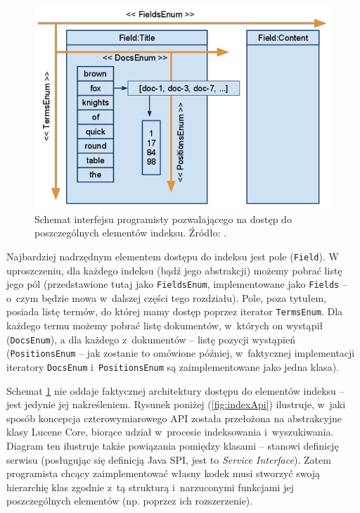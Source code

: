 \begin{figure}[here]
 \includegraphics[scale=0.5]{pictures/api.png}
 \caption{Schemat interfejsu programisty pozwalającego na dostęp do poszczególnych elementów indeksu. Źródło: \cite{flexindex}.\label{fig:4dimAPI}}
\end{figure}

Najbardziej nadrzędnym elementem dostępu do indeksu jest pole (\texttt{Field}). W uproszczeniu, dla każdego indeksu (bądź jego abstrakcji) możemy pobrać listę jego pól (przedstawione tutaj jako \texttt{FieldsEnum}, implementowane jako \texttt{Fields} -- o~czym będzie mowa w~dalszej części tego rozdziału). Pole, poza tytułem, posiada listę termów, do której mamy dostęp poprzez iterator \texttt{TermsEnum}. Dla każdego termu możemy pobrać listę dokumentów, w~których on wystąpił (\texttt{DocsEnum}), a dla każdego z~dokumentów -- listę pozycji wystąpień (\texttt{PositionsEnum} -- jak zostanie to omówione później, w~faktycznej implementacji iteratory \texttt{DocsEnum} i~\texttt{PositionsEnum} są zaimplementowane jako jedna klasa).

Schemat \ref{fig:4dimAPI} nie oddaje faktycznej architektury dostępu do elementów indeksu -- jest jedynie jej nakreśleniem. Rysunek poniżej (\ref{fig:indexApi}) ilustruje, w~jaki sposób koncepcja czterowymiarowego API została przełożona na abstrakcyjne klasy Lucene Core, biorące udział w~procesie indeksowania i~wyszukiwania. Diagram ten ilustruje także powiązania pomiędzy klasami -- stanowi definicję serwisu (posługując się definicją Java SPI, jest to \emph{Service Interface}). Zatem programista chcący zaimplementować własny kodek musi stworzyć swoją hierarchię klas zgodnie z~tą strukturą i~narzuconymi funkcjami jej poszczególnych elementów (np. poprzez ich rozszerzenie).

